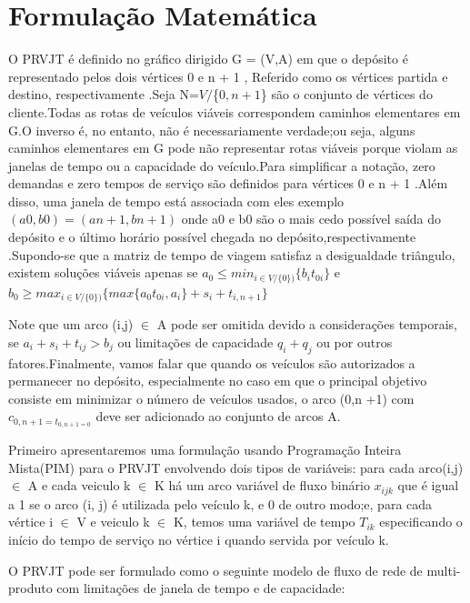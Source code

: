 \section{Formulação Matemática}



O PRVJT é definido no gráfico dirigido G = (V,A) em que o depósito é representado pelos dois vértices 0 e n + 1 , Referido como os vértices partida e destino, respectivamente .Seja N=$V/$\{$0,n+1$\} são o conjunto de vértices do cliente.Todas as rotas de veículos viáveis correspondem caminhos elementares em G.O inverso é, no entanto, não é necessariamente verdade;ou seja, alguns caminhos elementares em G pode não representar rotas viáveis porque violam as janelas de tempo ou a capacidade do veículo.Para simplificar a notação, zero demandas e zero tempos de serviço são definidos para vértices 0 e n + 1 .Além disso, uma janela de tempo está associada com eles exemplo $(a0, b0) = (an+1, bn+1)$ onde a0 e b0 são o mais cedo possível saída do depósito e o último horário possível chegada no depósito,respectivamente .Supondo-se que a matriz de tempo de viagem satisfaz a desigualdade triângulo, existem soluções viáveis apenas se $a_0 \leq min_{i \in V/\{0\})} \{b_i t_{0i}\} $ e $ b_0 \geq max_{i \in V/\{0\})} \{max\{a_0 t_{0i},a_i\}+s_i + t_{i,n+1} \}$




Note que um arco (i,j) $\in$ A pode ser omitida devido a considerações temporais, se $ a_i + s_i + t_{ij} > b_j$ ou limitações de capacidade $ q_i +q_j $ ou por outros fatores.Finalmente, vamos falar que quando os veículos são autorizados a permanecer no depósito, especialmente no caso em que o principal objetivo consiste em minimizar o número de veículos usados, o arco (0,n +1) com $c_{0,n+1 = t_{0,n+1 = 0}} $ deve ser adicionado ao conjunto de arcos A.



Primeiro apresentaremos uma formulação usando Programação Inteira Mista(PIM) para o PRVJT envolvendo dois tipos de variáveis: para cada arco(i,j)$\in$ A e cada veiculo k $\in$ K há um arco variável de fluxo binário $x_{ijk}$ que é igual a 1 se o arco (i, j) é utilizada pelo veículo k, e 0 de outro modo;e, para cada vértice i $\in$ V e veiculo k $\in$ K, temos uma variável de tempo $T_{ik}$ especificando o início do tempo de serviço no vértice i quando servida por veículo k.


O PRVJT pode ser formulado como o seguinte modelo de fluxo de rede de multi-produto com limitações de janela de tempo e de capacidade:

